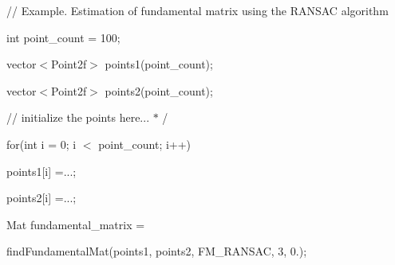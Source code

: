 {\ttfamily }

{\ttfamily }

{\ttfamily // Example. Estimation of fundamental matrix using the R\+A\+N\+S\+AC algorithm}

{\ttfamily }

{\ttfamily }

{\ttfamily int point\+\_\+count = 100;}

{\ttfamily }

{\ttfamily }

{\ttfamily vector$<$\+Point2f$>$ points1(point\+\_\+count);}

{\ttfamily }

{\ttfamily }

{\ttfamily vector$<$\+Point2f$>$ points2(point\+\_\+count);}

{\ttfamily }

{\ttfamily }

{\ttfamily // initialize the points here... $\ast$ /}

{\ttfamily }

{\ttfamily }

{\ttfamily for(int i = 0; i $<$ point\+\_\+count; i++)}

{\ttfamily }

{\ttfamily }

{\ttfamily points1\mbox{[}i\mbox{]} =...;}

{\ttfamily }

{\ttfamily }

{\ttfamily points2\mbox{[}i\mbox{]} =...;}

{\ttfamily }

{\ttfamily }

{\ttfamily Mat fundamental\+\_\+matrix =}

{\ttfamily }

{\ttfamily }

{\ttfamily find\+Fundamental\+Mat(points1, points2, F\+M\+\_\+\+R\+A\+N\+S\+AC, 3, 0.);}

{\ttfamily }

